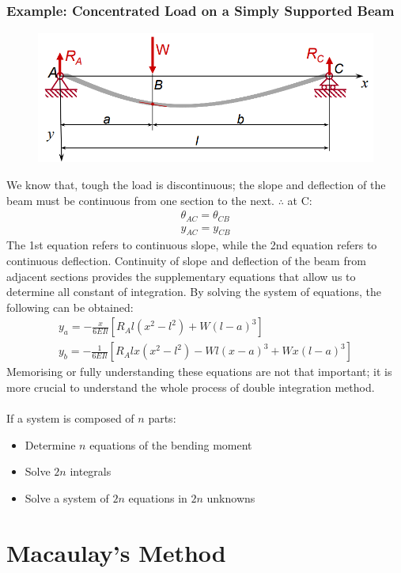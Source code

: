 \documentclass[class=report, crop=false, 12pt,a4paper]{standalone}
\begin{document}
\subsubsection{Example: Concentrated Load on a Simply Supported Beam}
\begin{figure}[H]
  \centering
  \includegraphics[width = 0.75 \textwidth]{../img/beam6.PNG}
\end{figure}
We know that, tough the load is discontinuous; the slope and deflection of the beam must be continuous from one section to the next. $\therefore$ at C:
\begin{gather}
  \theta_{AC} = \theta_{CB} \\
  y_{AC} = y_{CB}
\end{gather}
The 1st equation refers to continuous slope, while the 2nd equation refers to continuous deflection. Continuity of slope and deflection of the beam from adjacent sections provides the supplementary equations that allow us to determine all constant of integration. By solving the system of equations, the following can be obtained: 
\begin{gather}
  y_a = -\frac{x}{6EIl}[R_Al(x^2-l^2)+W(l-a)^3] \\
  y_b = -\frac{1}{6EIl}[R_Alx(x^2-l^2)-Wl(x-a)^3+Wx(l-a)^3]
\end{gather}
Memorising or fully understanding these equations are not that important; it is more crucial to understand the whole process of double integration method. \\\\
If a system is composed of $n$ parts:
\begin{itemize}[noitemsep]
  \item Determine $n$ equations of the bending moment
  \item Solve $2n$ integrals
  \item Solve a system of $2n$ equations in $2n$ unknowns
\end{itemize}
\section{Macaulay’s Method}
\end{document}
